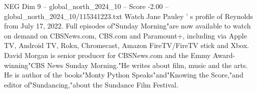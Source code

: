 \begin{textsample}{NEG Dim 9 – global\_north\_2024\_10 – Score -2.00 – global\_north\_2024\_10/115341223.txt}
Watch Jane Pauley ' s profile of Reynolds from July 17, 2022.
Full episodes of"Sunday Morning"are now available to watch on demand on CBSNews.com, CBS.com and Paramount+, including via Apple TV, Android TV, Roku, Chromecast, Amazon FireTV/FireTV stick and Xbox.
David Morgan is senior producer for CBSNews.com and the Emmy Award-winning"CBS News Sunday Morning."He writes about film, music and the arts.
He is author of the books"Monty Python Speaks"and"Knowing the Score,"and editor of"Sundancing,"about the Sundance Film Festival.

\end{textsample}
